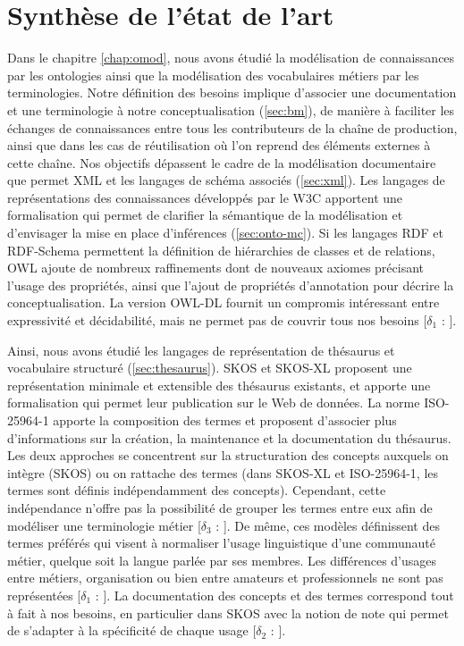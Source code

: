 \minitoc

\section{Synthèse de l'état de l'art}\label{sec:synthese}
Dans le chapitre \ref{chap:omod}, nous avons étudié la modélisation de connaissances par les ontologies ainsi que la modélisation des vocabulaires métiers par les terminologies. 
Notre définition des besoins implique d'associer une documentation et une terminologie à notre conceptualisation (\ref{sec:bm}), de manière à faciliter les échanges de connaissances entre tous les contributeurs de la chaîne de production, ainsi que dans les cas de réutilisation où l'on reprend des éléments externes à cette chaîne.
Nos objectifs dépassent le cadre de la modélisation documentaire que permet XML et les langages de schéma associés (\ref{sec:xml}).
Les langages de représentations des connaissances développés par le W3C apportent une formalisation qui permet de clarifier la sémantique de la modélisation et d'envisager la mise en place d'inférences (\ref{sec:onto-mc}).
Si les langages RDF et RDF-Schema permettent la définition de hiérarchies de classes et de relations, OWL ajoute de nombreux raffinements dont de nouveaux axiomes précisant l'usage des propriétés, ainsi que l'ajout de propriétés d'annotation pour décrire la conceptualisation.
La version OWL-DL fournit un compromis intéressant entre expressivité et décidabilité, mais ne permet pas de couvrir tous nos besoins [$\delta_1$ : ].

Ainsi, nous avons étudié les langages de représentation de thésaurus et vocabulaire structuré (\ref{sec:thesaurus}).
SKOS et SKOS-XL proposent une représentation minimale et extensible des thésaurus existants, et apporte une formalisation qui permet leur publication sur le Web de données.
La norme ISO-25964-1 apporte la composition des termes et proposent d'associer plus d'informations sur la création, la maintenance et la documentation du thésaurus.
Les deux approches se concentrent sur la structuration des concepts auxquels on intègre (SKOS) ou on rattache des termes (dans SKOS-XL et ISO-25964-1, les termes sont définis indépendamment des concepts). 
Cependant, cette indépendance n'offre pas la possibilité de grouper les termes entre eux afin de modéliser une terminologie métier [$\delta_3$ : ]. 
De même, ces modèles définissent des termes préférés qui visent à normaliser l'usage linguistique d'une communauté métier, quelque soit la langue parlée par ses membres.
Les différences d'usages entre métiers, organisation ou bien entre amateurs et professionnels ne sont pas représentées [$\delta_1$ : ]. 
La documentation des concepts et des termes correspond tout à fait à nos besoins, en particulier dans SKOS avec la notion de note qui permet de s'adapter à la spécificité de chaque usage [$\delta_2$ : ].\\



